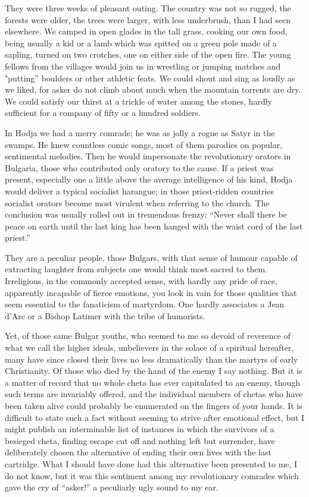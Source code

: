 \documentclass[a5paper,12pt]{book}
\begin{document}
They were three weeks of pleasant outing. The country was not so rugged, the forests were older, the trees were larger, with less underbrush, than I had seen elsewhere. We camped in open glades in the tall grass, cooking our own food, being usually a kid or a lamb which was spitted on a green pole made of a sapling, turned on two crotches, one on either side of the open fire. The young fellows from the villages would join us in wrestling or jumping matches and "putting” boulders or other athletic feats. We could shout and sing as loudly as we liked, for asker do not climb about much when the mountain torrents are dry. We could satisfy our thirst at a trickle of water among the stones, hardly sufficient for a company of fifty or a hundred soldiers. 

In Hodja we had a merry comrade; he was as jolly a rogue as Satyr in the swamps. He knew countless comic songs, most of them parodies on popular, sentimental melodies. Then he would impersonate the revolutionary orators in Bulgaria, those who contributed only oratory to the cause. If a priest was present, especially one a little above the average intelligence of his kind, Hodja would deliver a typical socialist harangue; in those priest-ridden countries socialist orators become most virulent when referring to the church. The conclusion was usually rolled out in tremendous frenzy: “Never shall there be peace on earth until the last king has been hanged with the waist cord of the last priest.” 

They are a peculiar people, those Bulgars, with that sense of humour capable of extracting laughter from subjects one would think most sacred to them. Irreligious, in the commonly accepted sense, with hardly any pride of race, apparently incapable of fierce emotions, you look in vain for those qualities that seem essential to the fanaticism of martyrdom. One hardly associates a Jean d'Arc or a Bishop Latimer with the tribe of humorists. 

Yet, of those same Bulgar youths, who seemed to me so devoid of reverence of what we call the higher ideals, unbelievers in the solace of a spiritual hereafter, many have since closed their lives no less dramatically than the martyrs of early Christianity. Of those who died by the hand of the enemy I say nothing. But it is a matter of record that no whole cheta has ever capitulated to an enemy, though such terms are invariably offered, and the individual members of chetas who have been taken alive could probably be enumerated on the fingers of your hands. It is difficult to state such a fact without seeming to strive after emotional effect, but I might publish an interminable list of instances in which the survivors of a besieged cheta, finding escape cut off and nothing left but surrender, have deliberately chosen the alternative of ending their own lives with the last cartridge. What I should have done had this alternative been presented to me, I do not know, but it was this sentiment among my revolutionary comrades which gave the cry of “asker!” a peculiarly ugly sound to my ear. 
\end{document}
